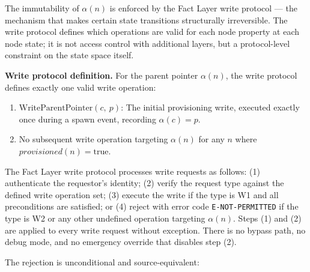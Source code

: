 The immutability of $\alpha(n)$ is enforced by the Fact Layer write protocol — the \bxthree{} mechanism that makes certain state transitions structurally irreversible. The write protocol defines which operations are valid for each node property at each node state; it is not access control with additional layers, but a protocol-level constraint on the state space itself.

\medskip
\noindent\textbf{Write protocol definition.} For the parent pointer $\alpha(n)$, the write protocol defines exactly one valid write operation:

\begin{enumerate}
    \item[$\textbf{W1}$] $\mathrm{WriteParentPointer}(c,\ p)$: The initial provisioning write, executed exactly once during a spawn event, recording $\alpha(c) = p$.
    \item[$\textbf{W2}$] No subsequent write operation targeting $\alpha(n)$ for any $n$ where $\textit{provisioned}(n) = \text{true}$.
\end{enumerate}

The Fact Layer write protocol processes write requests as follows: (1) authenticate the requestor's identity; (2) verify the request type against the defined write operation set; (3) execute the write if the type is W1 and all preconditions are satisfied; or (4) reject with error code \texttt{E-NOT-PERMITTED} if the type is W2 or any other undefined operation targeting $\alpha(n)$. Steps (1) and (2) are applied to every write request without exception. There is no bypass path, no debug mode, and no emergency override that disables step (2).

The rejection is unconditional and source-equivalent:

